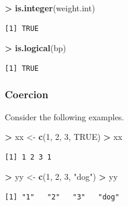 \documentclass[]{krantz}
\makeatletter
\newenvironment{Shaded}{\begin{snugshade}}{\end{snugshade}}
\newcommand{\KeywordTok}[1]{\textcolor[rgb]{0.27,0.27,0.27}{\textbf{#1}}}
\newcommand{\DecValTok}[1]{\textcolor[rgb]{0.06,0.06,0.06}{#1}}
\newcommand{\StringTok}[1]{\textcolor[rgb]{0.5,0.5,0.5}{#1}}
\newcommand{\OtherTok}[1]{\textcolor[rgb]{0.37,0.37,0.37}{#1}}
\newcommand{\OperatorTok}[1]{\textcolor[rgb]{0.43,0.43,0.43}{\textbf{#1}}}
\newcommand{\NormalTok}[1]{#1}
\newenvironment{kframe}{%
\medskip{}
\setlength{\fboxsep}{.8em}
 \def\at@end@of@kframe{}%
 \ifinner\ifhmode%
  \def\at@end@of@kframe{\end{minipage}}%
  \begin{minipage}{\columnwidth}%
 \fi\fi%
 \def\FrameCommand##1{\hskip\@totalleftmargin \hskip-\fboxsep
 \colorbox{shadecolor}{##1}\hskip-\fboxsep
     \hskip-\linewidth \hskip-\@totalleftmargin \hskip\columnwidth}%
 \MakeFramed {\advance\hsize-\width
   \@totalleftmargin\z@ \linewidth\hsize
   \@setminipage}}%
 {\par\unskip\endMakeFramed%
 \at@end@of@kframe}
\renewenvironment{Shaded}{\begin{kframe}}{\end{kframe}}
\makeatother
\begin{document}
\begin{Shaded}
\begin{Highlighting}[]
\OperatorTok{>}\StringTok{ }\KeywordTok{is.integer}\NormalTok{(weight.int)}
\end{Highlighting}
\end{Shaded}

\begin{verbatim}
[1] TRUE
\end{verbatim}

\begin{Shaded}
\begin{Highlighting}[]
\OperatorTok{>}\StringTok{ }\KeywordTok{is.logical}\NormalTok{(bp)}
\end{Highlighting}
\end{Shaded}

\begin{verbatim}
[1] TRUE
\end{verbatim}

\subsubsection{Coercion}\label{coercion}

Consider the following examples.

\begin{Shaded}
\begin{Highlighting}[]
\OperatorTok{>}\StringTok{ }\NormalTok{xx <-}\StringTok{ }\KeywordTok{c}\NormalTok{(}\DecValTok{1}\NormalTok{, }\DecValTok{2}\NormalTok{, }\DecValTok{3}\NormalTok{, }\OtherTok{TRUE}\NormalTok{)}
\OperatorTok{>}\StringTok{ }\NormalTok{xx}
\end{Highlighting}
\end{Shaded}

\begin{verbatim}
[1] 1 2 3 1
\end{verbatim}

\begin{Shaded}
\begin{Highlighting}[]
\OperatorTok{>}\StringTok{ }\NormalTok{yy <-}\StringTok{ }\KeywordTok{c}\NormalTok{(}\DecValTok{1}\NormalTok{, }\DecValTok{2}\NormalTok{, }\DecValTok{3}\NormalTok{, }\StringTok{"dog"}\NormalTok{)}
\OperatorTok{>}\StringTok{ }\NormalTok{yy}
\end{Highlighting}
\end{Shaded}

\begin{verbatim}
[1] "1"   "2"   "3"   "dog"
\end{verbatim}
\end{document}
